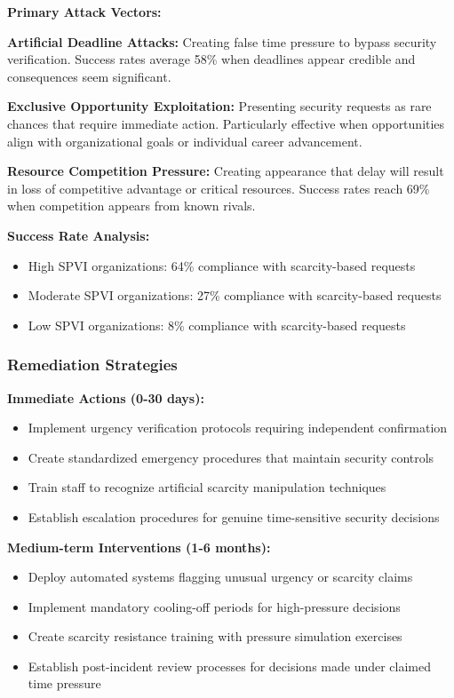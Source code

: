 \documentclass[11pt,a4paper]{article}
\begin{document}
\textbf{Primary Attack Vectors:}

\textbf{Artificial Deadline Attacks:} Creating false time pressure to bypass security verification. Success rates average 58\% when deadlines appear credible and consequences seem significant.

\textbf{Exclusive Opportunity Exploitation:} Presenting security requests as rare chances that require immediate action. Particularly effective when opportunities align with organizational goals or individual career advancement.

\textbf{Resource Competition Pressure:} Creating appearance that delay will result in loss of competitive advantage or critical resources. Success rates reach 69\% when competition appears from known rivals.

\textbf{Success Rate Analysis:}
\begin{itemize}
\item High SPVI organizations: 64\% compliance with scarcity-based requests
\item Moderate SPVI organizations: 27\% compliance with scarcity-based requests
\item Low SPVI organizations: 8\% compliance with scarcity-based requests
\end{itemize}

\subsubsection{Remediation Strategies}

\textbf{Immediate Actions (0-30 days):}
\begin{itemize}
\item Implement urgency verification protocols requiring independent confirmation
\item Create standardized emergency procedures that maintain security controls
\item Train staff to recognize artificial scarcity manipulation techniques
\item Establish escalation procedures for genuine time-sensitive security decisions
\end{itemize}

\textbf{Medium-term Interventions (1-6 months):}
\begin{itemize}
\item Deploy automated systems flagging unusual urgency or scarcity claims
\item Implement mandatory cooling-off periods for high-pressure decisions
\item Create scarcity resistance training with pressure simulation exercises
\item Establish post-incident review processes for decisions made under claimed time pressure
\end{itemize}
\end{document}
